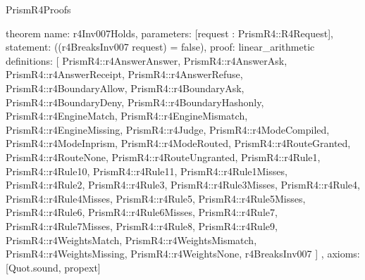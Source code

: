 \begin{lexlean}{PrismR4Proofs}
\begin{semanticmodule}
theorem{
  name: r4Inv007Holds,
  parameters: [request : PrismR4::R4Request],
  statement: ((r4BreaksInv007 request) = false),
  proof: linear_arithmetic{
    definitions: [
      PrismR4::r4AnswerAnswer,
      PrismR4::r4AnswerAsk,
      PrismR4::r4AnswerReceipt,
      PrismR4::r4AnswerRefuse,
      PrismR4::r4BoundaryAllow,
      PrismR4::r4BoundaryAsk,
      PrismR4::r4BoundaryDeny,
      PrismR4::r4BoundaryHashonly,
      PrismR4::r4EngineMatch,
      PrismR4::r4EngineMismatch,
      PrismR4::r4EngineMissing,
      PrismR4::r4Judge,
      PrismR4::r4ModeCompiled,
      PrismR4::r4ModeInprism,
      PrismR4::r4ModeRouted,
      PrismR4::r4RouteGranted,
      PrismR4::r4RouteNone,
      PrismR4::r4RouteUngranted,
      PrismR4::r4Rule1,
      PrismR4::r4Rule10,
      PrismR4::r4Rule11,
      PrismR4::r4Rule1Misses,
      PrismR4::r4Rule2,
      PrismR4::r4Rule3,
      PrismR4::r4Rule3Misses,
      PrismR4::r4Rule4,
      PrismR4::r4Rule4Misses,
      PrismR4::r4Rule5,
      PrismR4::r4Rule5Misses,
      PrismR4::r4Rule6,
      PrismR4::r4Rule6Misses,
      PrismR4::r4Rule7,
      PrismR4::r4Rule7Misses,
      PrismR4::r4Rule8,
      PrismR4::r4Rule9,
      PrismR4::r4WeightsMatch,
      PrismR4::r4WeightsMismatch,
      PrismR4::r4WeightsMissing,
      PrismR4::r4WeightsNone,
      r4BreaksInv007
    ]
  },
  axioms: [Quot.sound, propext]
}
\end{semanticmodule}
\end{lexlean}
